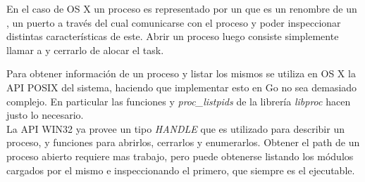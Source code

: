 En el caso de OS X un proceso es representado por un  que es un
renombre de un , un puerto a través del cual comunicarse con
el proceso y poder inspeccionar distintas características de este. Abrir un
proceso luego consiste simplemente llamar a  y cerrarlo de
alocar el task.

Para obtener información de un proceso y listar los mismos se utiliza en OS X
la API POSIX del sistema, haciendo que implementar esto en Go no sea demasiado
complejo. En particular las funciones  y
\textit{proc_listpids} de la librería \textit{libproc} hacen justo lo
necesario.\\

La API WIN32 ya provee un tipo \textit{HANDLE} que es utilizado para describir
un proceso, y funciones para abrirlos, cerrarlos y enumerarlos. Obtener el path
de un proceso abierto requiere mas trabajo, pero puede obtenerse listando los
módulos cargados por el mismo e inspeccionando el primero, que siempre es el
ejecutable.\\

